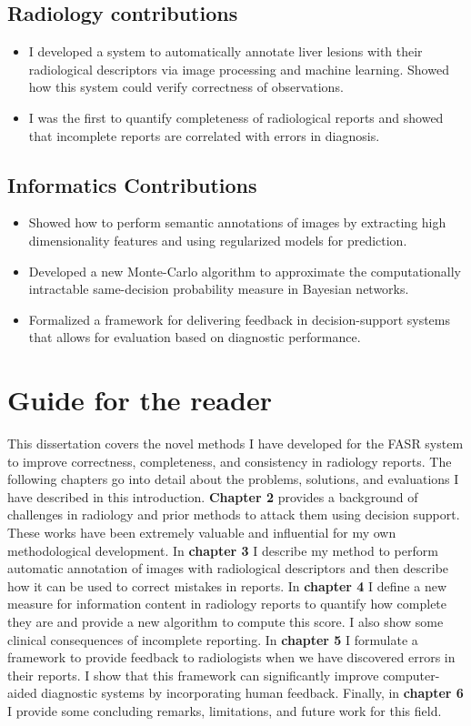 \subsection{Radiology contributions}

\begin{itemize}
	\item I developed a system to automatically annotate liver lesions with their radiological descriptors via image processing and machine learning. Showed how this system could verify correctness of observations.
	\item I was the first to quantify completeness of radiological reports and showed that incomplete reports are correlated with errors in diagnosis.
\end{itemize}

\subsection{Informatics Contributions}

\begin{itemize}
	\item Showed how to perform semantic annotations of images by extracting high dimensionality features and using regularized models for prediction.
	\item Developed a new Monte-Carlo algorithm to approximate the computationally intractable same-decision probability measure in Bayesian networks.
	\item Formalized a framework for delivering feedback in decision-support systems that allows for evaluation based on diagnostic performance.
\end{itemize}


\section{Guide for the reader}
This dissertation covers the novel methods I have developed for the FASR system to improve correctness, completeness, and consistency in radiology reports. The following chapters go into detail about the problems, solutions, and evaluations I have described in this introduction. \textbf{Chapter 2} provides a background of challenges in radiology and prior methods to attack them using decision support. These works have been extremely valuable and influential for my own methodological development. In \textbf{chapter 3} I describe my method to perform automatic annotation of images with radiological descriptors and then describe how it can be used to correct mistakes in reports. In \textbf{chapter 4} I define a new measure for information content in radiology reports to quantify how complete they are and provide a new algorithm to compute this score. I also show some clinical consequences of incomplete reporting. In \textbf{chapter 5} I formulate a framework to provide feedback to radiologists when we have discovered errors in their reports. I show that this framework can significantly improve computer-aided diagnostic systems by incorporating human feedback. Finally, in \textbf{chapter 6} I provide some concluding remarks, limitations, and future work for this field.